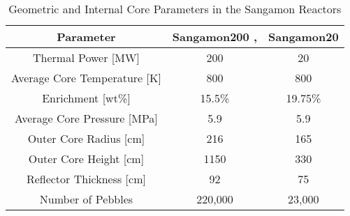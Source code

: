 \begin{table}[h!]
\centering
\caption{Geometric and Internal Core Parameters in the Sangamon Reactors}
\begin{tabular}{ c  c  c }
\hline
Parameter & Sangamon200 \cite{harlan_x-energy_2018}, \cite{harlan_ans_2017} & Sangamon20 \\
\hline
Thermal Power [MW] & 200 & 20 \\
Average Core Temperature [K] & 800 & 800 \\
Enrichment [wt\%] & 15.5\% & 19.75\% \\
Average Core Pressure [MPa] & 5.9 & 5.9 \\
Outer Core Radius [cm] & 216 & 165 \\
Outer Core Height [cm] & 1150 & 330 \\
Reflector Thickness [cm] & 92 & 75 \\
Number of Pebbles & 220,000 & 23,000 \\
\hline
\end{tabular}

\label{table:params1}
\end{table}